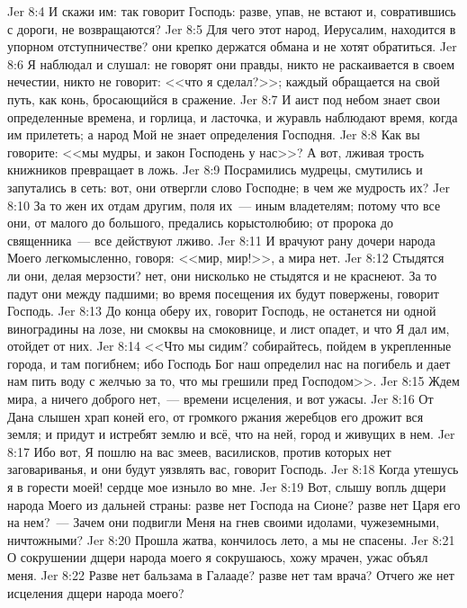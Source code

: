 \vs Jer 8:4 И скажи им: так говорит Господь: разве, упав, не встают и, совратившись с дороги, не возвращаются?
\vs Jer 8:5 Для чего этот народ, Иерусалим, находится в упорном отступничестве? они крепко держатся обмана и не хотят обратиться.
\vs Jer 8:6 Я наблюдал и слушал: не говорят они правды, никто не раскаивается в своем нечестии, никто не говорит: <<что я сделал?>>; каждый обращается на свой путь, как конь, бросающийся в сражение.
\vs Jer 8:7 И аист под небом знает свои определенные времена, и горлица, и ласточка, и журавль наблюдают время, когда им прилететь; а народ Мой не знает определения Господня.
\vs Jer 8:8 Как вы говорите: <<мы мудры, и закон Господень у нас>>? А вот, лживая трость книжников  превращает в ложь.
\vs Jer 8:9 Посрамились мудрецы, смутились и запутались в сеть: вот, они отвергли слово Господне; в чем же мудрость их?
\vs Jer 8:10 За то жен их отдам другим, поля их~--- иным владетелям; потому что все они, от малого до большого, предались корыстолюбию; от пророка до священника~--- все действуют лживо.
\vs Jer 8:11 И врачуют рану дочери народа Моего легкомысленно, говоря: <<мир, мир!>>, а мира нет.
\vs Jer 8:12 Стыдятся ли они, делая мерзости? нет, они нисколько не стыдятся и не краснеют. За то падут они между падшими; во время посещения их будут повержены, говорит Господь.
\vs Jer 8:13 До конца оберу их, говорит Господь, не останется ни одной виноградины на лозе, ни смоквы на смоковнице, и лист опадет, и что Я дал им, отойдет от них.
\vs Jer 8:14 <<Что мы сидим? собирайтесь, пойдем в укрепленные города, и там погибнем; ибо Господь Бог наш определил нас на погибель и дает нам пить воду с желчью за то, что мы грешили пред Господом>>.
\vs Jer 8:15 Ждем мира, а ничего доброго нет,~--- времени исцеления, и вот ужасы.
\vs Jer 8:16 От Дана слышен храп коней его, от громкого ржания жеребцов его дрожит вся земля; и придут и истребят землю и всё, что на ней, город и живущих в нем.
\vs Jer 8:17 Ибо вот, Я пошлю на вас змеев, василисков, против которых нет заговариванья, и они будут уязвлять вас, говорит Господь.
\vs Jer 8:18 Когда утешусь я в горести моей! сердце мое изныло во мне.
\vs Jer 8:19 Вот, слышу вопль дщери народа Моего из дальней страны: разве нет Господа на Сионе? разве нет Царя его на нем?~--- Зачем они подвигли Меня на гнев своими идолами, чужеземными, ничтожными?
\vs Jer 8:20 Прошла жатва, кончилось лето, а мы не спасены.
\vs Jer 8:21 О сокрушении дщери народа моего я сокрушаюсь, хожу мрачен, ужас объял меня.
\vs Jer 8:22 Разве нет бальзама в Галааде? разве нет там врача? Отчего же нет исцеления дщери народа моего?
